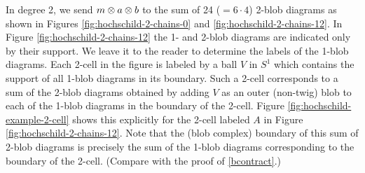 In degree 2, we send $m\otimes a \otimes b$ to the sum of 24 ($=6\cdot4$) 2-blob diagrams as shown in
Figures \ref{fig:hochschild-2-chains-0} and \ref{fig:hochschild-2-chains-12}.
In Figure \ref{fig:hochschild-2-chains-12} the 1- and 2-blob diagrams are indicated only by their support.
We leave it to the reader to determine the labels of the 1-blob diagrams.
Each 2-cell in the figure is labeled by a ball $V$ in $S^1$ which contains the support of all
1-blob diagrams in its boundary.
Such a 2-cell corresponds to a sum of the 2-blob diagrams obtained by adding $V$
as an outer (non-twig) blob to each of the 1-blob diagrams in the boundary of the 2-cell.
Figure \ref{fig:hochschild-example-2-cell} shows this explicitly for the 2-cell
labeled $A$ in Figure \ref{fig:hochschild-2-chains-12}.
Note that the (blob complex) boundary of this sum of 2-blob diagrams is
precisely the sum of the 1-blob diagrams corresponding to the boundary of the 2-cell.
(Compare with the proof of \ref{bcontract}.)
